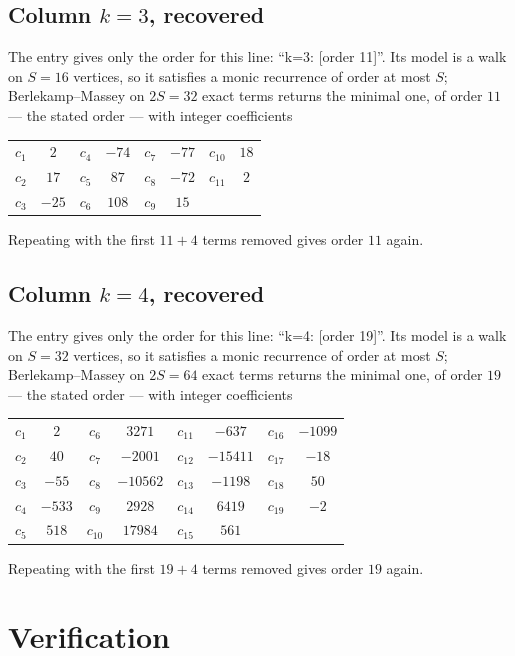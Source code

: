 \documentclass[11pt,a4paper]{article}
\theoremstyle{plain}
\theoremstyle{definition}
\begin{document}
\subsection*{Column $k=3$, recovered}
The entry gives only the order for this line: ``k=3: [order 11]''. Its model is a walk on
$S=16$ vertices, so it satisfies a monic recurrence of order at most $S$;
Berlekamp--Massey on $2S=32$ exact terms returns the minimal one, of order
$11$ --- the stated order --- with integer coefficients
\begin{center}\small\begin{tabular}{cccccccc}
$c_{1}$ & $2$ & $c_{4}$ & $-74$ & $c_{7}$ & $-77$ & $c_{10}$ & $18$ \\
$c_{2}$ & $17$ & $c_{5}$ & $87$ & $c_{8}$ & $-72$ & $c_{11}$ & $2$ \\
$c_{3}$ & $-25$ & $c_{6}$ & $108$ & $c_{9}$ & $15$ &  &  \\
\end{tabular}\end{center}
Repeating with the first $11+4$ terms removed gives order $11$ again.

\subsection*{Column $k=4$, recovered}
The entry gives only the order for this line: ``k=4: [order 19]''. Its model is a walk on
$S=32$ vertices, so it satisfies a monic recurrence of order at most $S$;
Berlekamp--Massey on $2S=64$ exact terms returns the minimal one, of order
$19$ --- the stated order --- with integer coefficients
\begin{center}\small\begin{tabular}{cccccccc}
$c_{1}$ & $2$ & $c_{6}$ & $3271$ & $c_{11}$ & $-637$ & $c_{16}$ & $-1099$ \\
$c_{2}$ & $40$ & $c_{7}$ & $-2001$ & $c_{12}$ & $-15411$ & $c_{17}$ & $-18$ \\
$c_{3}$ & $-55$ & $c_{8}$ & $-10562$ & $c_{13}$ & $-1198$ & $c_{18}$ & $50$ \\
$c_{4}$ & $-533$ & $c_{9}$ & $2928$ & $c_{14}$ & $6419$ & $c_{19}$ & $-2$ \\
$c_{5}$ & $518$ & $c_{10}$ & $17984$ & $c_{15}$ & $561$ &  &  \\
\end{tabular}\end{center}
Repeating with the first $19+4$ terms removed gives order $19$ again.

\section{Verification}
\end{document}
